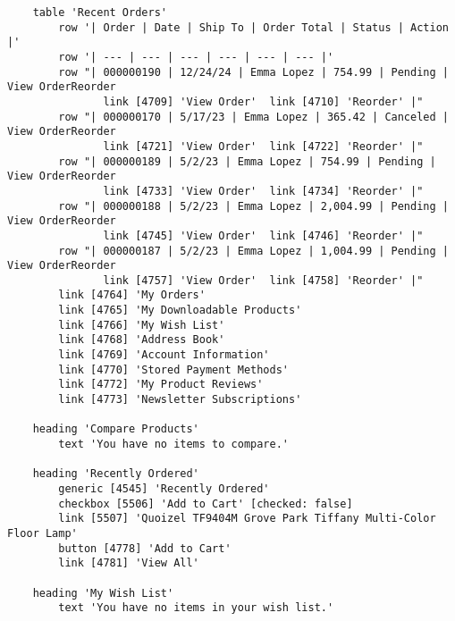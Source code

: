 \begin{tcolorbox}[breakable]
\begin{lstlisting}
    table 'Recent Orders'
        row '| Order | Date | Ship To | Order Total | Status | Action |'
        row '| --- | --- | --- | --- | --- | --- |'
        row "| 000000190 | 12/24/24 | Emma Lopez | 754.99 | Pending | View OrderReorder
               link [4709] 'View Order'  link [4710] 'Reorder' |"
        row "| 000000170 | 5/17/23 | Emma Lopez | 365.42 | Canceled | View OrderReorder
               link [4721] 'View Order'  link [4722] 'Reorder' |"
        row "| 000000189 | 5/2/23 | Emma Lopez | 754.99 | Pending | View OrderReorder
               link [4733] 'View Order'  link [4734] 'Reorder' |"
        row "| 000000188 | 5/2/23 | Emma Lopez | 2,004.99 | Pending | View OrderReorder
               link [4745] 'View Order'  link [4746] 'Reorder' |"
        row "| 000000187 | 5/2/23 | Emma Lopez | 1,004.99 | Pending | View OrderReorder
               link [4757] 'View Order'  link [4758] 'Reorder' |"
        link [4764] 'My Orders'
        link [4765] 'My Downloadable Products'
        link [4766] 'My Wish List'
        link [4768] 'Address Book'
        link [4769] 'Account Information'
        link [4770] 'Stored Payment Methods'
        link [4772] 'My Product Reviews'
        link [4773] 'Newsletter Subscriptions'

    heading 'Compare Products'
        text 'You have no items to compare.'

    heading 'Recently Ordered'
        generic [4545] 'Recently Ordered'
        checkbox [5506] 'Add to Cart' [checked: false]
        link [5507] 'Quoizel TF9404M Grove Park Tiffany Multi-Color Floor Lamp'
        button [4778] 'Add to Cart'
        link [4781] 'View All'

    heading 'My Wish List'
        text 'You have no items in your wish list.'


\end{lstlisting}
\end{tcolorbox}

